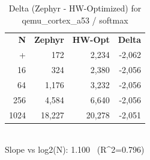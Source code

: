 \begin{table}[tb]
    \centering
    \caption{Delta (Zephyr - HW-Optimized) for qemu_cortex_a53 / softmax}
    \label{tab:delta_qemu_cortex_a53_softmax}
    \scriptsize
    \begin{tabular}{r r r r}
        \hline
        \textbf{N} & \textbf{Zephyr} & \textbf{HW-Opt} & \textbf{Delta} \\\n+        \hline
        4 & 172 & 2,234 & -2,062\\
        16 & 324 & 2,380 & -2,056\\
        64 & 1,176 & 3,232 & -2,056\\
        256 & 4,584 & 6,640 & -2,056\\
        1024 & 18,227 & 20,278 & -2,051\\
        \hline
    \end{tabular}
    \vspace{2mm}\\\n    Slope vs log2(N): 1.100 \ (R^2=0.796)\n\end{table}
